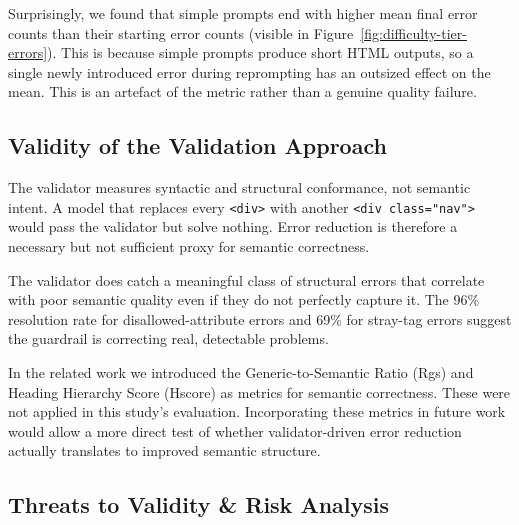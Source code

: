 
Surprisingly, we found that simple prompts end with higher mean final error counts than their starting error counts (visible in Figure~\ref{fig:difficulty-tier-errors}). This is because simple prompts produce short HTML outputs, so a single newly introduced error during reprompting has an outsized effect on the mean. This is an artefact of the metric rather than a genuine quality failure.

\subsection{Validity of the Validation Approach}


The validator measures syntactic and structural conformance, not semantic intent. A model that replaces every \verb|<div>| with another \verb|<div class="nav">| would pass the validator but solve nothing. Error reduction is therefore a necessary but not sufficient proxy for semantic correctness.


The validator does catch a meaningful class of structural errors that correlate with poor semantic quality even if they do not perfectly capture it. The 96\% resolution rate for disallowed-attribute errors and 69\% for stray-tag errors suggest the guardrail is correcting real, detectable problems.


In the related work we introduced the Generic-to-Semantic Ratio (Rgs) and Heading Hierarchy Score (Hscore) as metrics for semantic correctness. These were not applied in this study's evaluation. Incorporating these metrics in future work would allow a more direct test of whether validator-driven error reduction actually translates to improved semantic structure.


\subsection{Threats to Validity \& Risk Analysis}


